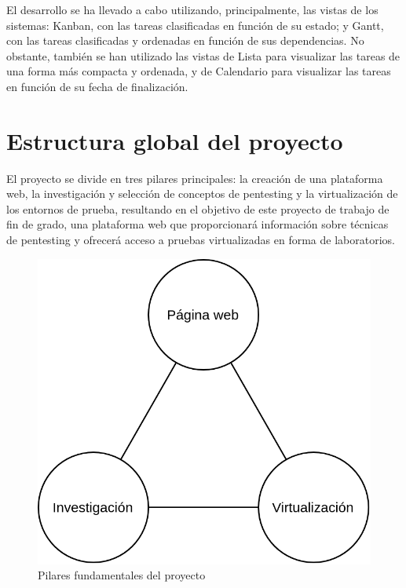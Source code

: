         El desarrollo se ha llevado a cabo utilizando, principalmente, las vistas de los sistemas: Kanban, con las tareas clasificadas en función de su estado; y Gantt, con las tareas clasificadas y ordenadas en función de sus dependencias. No obstante, también se han utilizado las vistas de Lista para visualizar las tareas de una forma más compacta y ordenada, y de Calendario para visualizar las tareas en función de su fecha de finalización.
        
        \newpage
    

    \section{Estructura global del proyecto}
        \label{sec:estructura-global}
        
        El proyecto se divide en tres pilares principales: la creación de una plataforma web, la investigación y selección de conceptos de pentesting y la virtualización de los entornos de prueba, resultando en el objetivo de este proyecto de trabajo de fin de grado, una plataforma web que proporcionará información sobre técnicas de pentesting y ofrecerá acceso a pruebas virtualizadas en forma de laboratorios. 
        
        \begin{figure}[h]
            \centering

            \includegraphics[scale=0.30]{images/Diagramas/Estructura global.png}
            
            \caption{Pilares fundamentales del proyecto}
            \label{fig:estructura-global}
        \end{figure}
            
